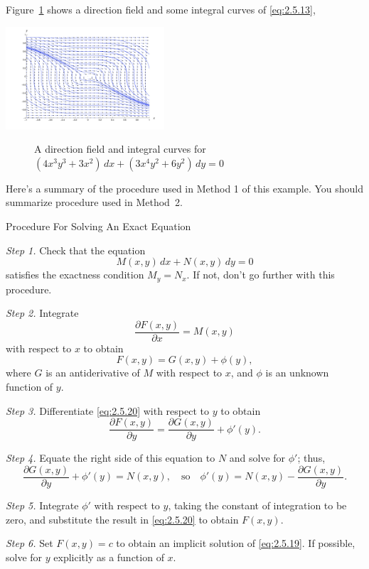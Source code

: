 \documentclass{ximera}
\begin{document}
\begin{example}
\begin{explanation}
Figure~\ref{figure:2.5.1} shows a direction field and  some
integral curves of \eqref{eq:2.5.13},
 
\begin{image}
  \includegraphics[height=1.5in]{fig020501.jpg} \end{image}
\begin{center}
\begin{figure}
   \caption{A direction field and  integral curves for
$(4x^3y^3+3x^2)\,dx+(3x^4y^2+6y^2)\,dy=0$}
  \label{figure:2.5.1}
\end{figure}
\end{center}
\end{explanation}
\end{example}
 
 
Here's a summary of the procedure used in Method 1 of this
example. You should summarize procedure used in Method~2.
 
 
Procedure For Solving An Exact
Equation
 
 
\begin{procedure}\label{proc:solvingExactEq}
 
\textit{Step 1.} Check that the equation
\begin{equation} \label{eq:2.5.19}
 M(x,y)\,dx+N(x,y)\,dy=0
\end{equation}
satisfies the exactness condition  $M_y=N_x$. If not,
don't go further with this procedure.
 
\textit{Step 2.} Integrate
$$
\frac{\partial F(x,y)}{\partial x}=M(x,y)
$$
with respect to $x$ to obtain
\begin{equation} \label{eq:2.5.20}
F(x,y)=G(x,y)+\phi(y),
\end{equation}
where $G$ is an antiderivative of $M$ with respect to $x$, and $\phi$
is an unknown function of $y$.
 
\textit{Step 3.} Differentiate \eqref{eq:2.5.20} with respect to
$y$  to obtain
$$
\frac{\partial F(x,y)}{\partial y}=\frac{\partial G(x,y)}{\partial
y}+\phi'(y).
$$
 
\textit{Step 4.} Equate the right side of this equation to $N$ and solve
for $\phi'$;    thus,
$$
 \frac{\partial G(x,y)}{\partial y}+\phi'(y)=N(x,y),\quad\text{so}\quad
\phi'(y)=N(x,y)-\frac{\partial G(x,y)}{\partial y}.
$$
 
\textit{Step 5.} Integrate $\phi'$ with respect to $y$, taking the
constant of integration to be zero, and substitute the result in
\eqref{eq:2.5.20} to obtain $F(x,y)$.
 
\textit{Step 6.} Set $F(x,y)=c$ to obtain an implicit solution of
\eqref{eq:2.5.19}. If possible, solve for $y$ explicitly as a
function of $x$.
 
\end{procedure}
 
\end{document}
